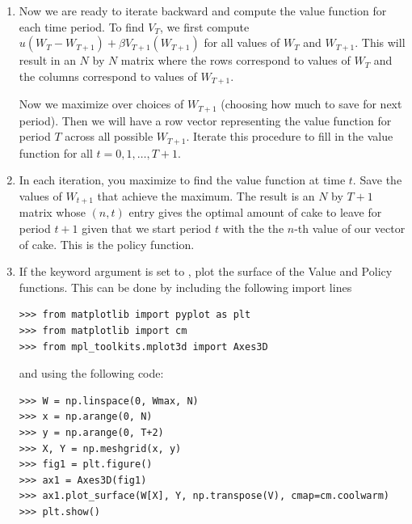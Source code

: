 \begin{problem}
\begin{enumerate}
\item Now we are ready to iterate backward and compute the value function for each time period.  To find $V_T$, we first compute
$u(W_T - W_{T+1}) + \beta V_{T+1}(W_{T+1})$ for all values of $W_{T}$ and $W_{T+1}$.  This will result in an $N$ by $N$ matrix
where the rows correspond to values of $W_{T}$ and the columns correspond to values of $W_{T+1}$.

Now we maximize over choices of $W_{T+1}$ (choosing how much to save for next period).  Then we will have a row vector
representing the value function for period $T$ across all possible $W_{T+1}$.  Iterate this procedure to fill in the value
function for all $t=0,1,\ldots, T+1$.

\item In each iteration, you maximize to find the value function at time $t$.  Save the values of $W_{t+1}$ that achieve the
maximum.  The result is an $N$ by $T+1$ matrix whose $(n,t)$ entry gives the optimal amount of cake to leave for period
$t+1$ given that we start period $t$ with the the $n$-th value of our vector of cake.  This is the policy function.

\item If the keyword argument  is set to , plot the surface of the Value and Policy functions.
This can be done by including the following import lines
\begin{lstlisting}
>>> from matplotlib import pyplot as plt
>>> from matplotlib import cm
>>> from mpl_toolkits.mplot3d import Axes3D
\end{lstlisting}
and using the following code:
\begin{lstlisting}
>>> W = np.linspace(0, Wmax, N)
>>> x = np.arange(0, N)
>>> y = np.arange(0, T+2)
>>> X, Y = np.meshgrid(x, y)
>>> fig1 = plt.figure()
>>> ax1 = Axes3D(fig1)
>>> ax1.plot_surface(W[X], Y, np.transpose(V), cmap=cm.coolwarm)
>>> plt.show()


\end{lstlisting}
\end{enumerate}
\end{problem}
